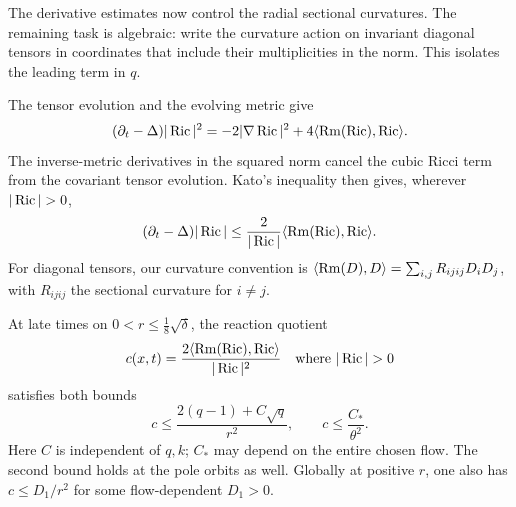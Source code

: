 The derivative estimates now control the radial sectional curvatures.
The remaining task is algebraic: write the curvature action on invariant
diagonal tensors in coordinates that include their multiplicities in the
norm. This isolates the leading term in \(q\).

The tensor evolution and the evolving metric give
\[
(\partial_t-\Delta)|\operatorname{Ric}|^2=-2|\nabla\operatorname{Ric}|^2
                         +4\langle\operatorname{Rm}(\operatorname{Ric}),\operatorname{Ric}\rangle.
\]
The inverse-metric derivatives in the squared norm cancel the cubic
Ricci term from the covariant tensor evolution. Kato's inequality then
gives, wherever \(|\Ric|>0\),
\begin{equation}\label{eq:ricci-norm}
(\partial_t-\Delta)|\operatorname{Ric}|
\le \frac{2}{|\operatorname{Ric}|}\langle\operatorname{Rm}(\operatorname{Ric}),\operatorname{Ric}\rangle.
\end{equation}
For diagonal tensors, our curvature convention is
\(\langle\operatorname{Rm}(D),D\rangle=\sum_{i,j}R_{ijij}D_iD_j\), with
\(R_{ijij}\) the sectional curvature for \(i\ne j\).

\begin{proposition}\label{prop:reaction}
At late times on \(0<r\le\frac18\sqrt\delta\), the reaction quotient
\[
c(x,t)=\frac{2\langle\Rm(\Ric),\Ric\rangle}{|\Ric|^2}
\quad\text{where }|\Ric|>0
\]
satisfies both bounds
\begin{equation}\label{eq:reaction-two}
c\le\frac{2(q-1)+C\sqrt q}{r^2},\qquad
c\le\frac{C_*}{\theta^2}.
\end{equation}
Here \(C\) is independent of \(q,k\); \(C_*\) may depend on the entire
chosen flow. The second bound holds at the pole orbits as well.
Globally at positive \(r\), one also has \(c\le D_1/r^2\) for some
flow-dependent \(D_1>0\).
\end{proposition}


